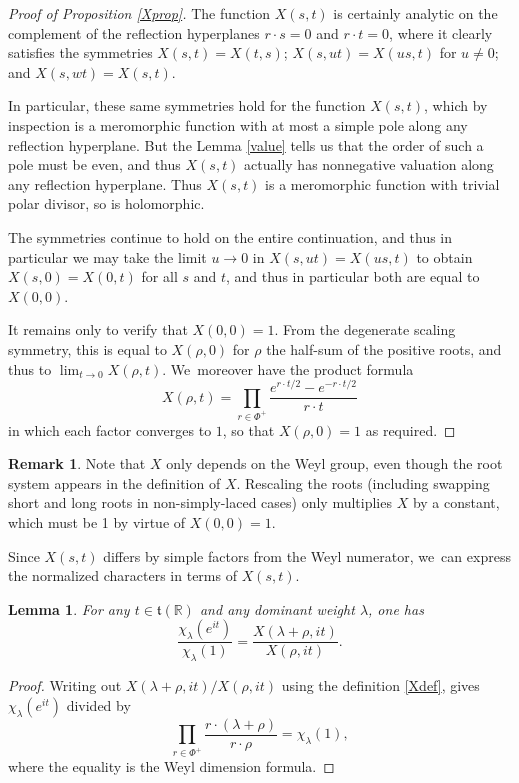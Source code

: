 \documentclass[10pt]{amsart}
\newtheorem{lem}[equation]{Lemma}
\theoremstyle{definition}
\newtheorem{rmk}[equation]{Remark}
\let\la\lambda
\newcommand{\mft}{\mathfrak{t}}
\newcommand{\R}{\mathbb{R}}
\numberwithin{equation}{section}
\begin{document}
\begin{proof}[Proof of Proposition \ref{Xprop}]
The function $X(s,t)$ is certainly analytic on the complement of the
reflection hyperplanes $r\cdot s = 0$ and $r\cdot t = 0$, where it clearly
satisfies the symmetries $X(s,t)=X(t,s)$; $X(s,ut)=X(us,t)$ for $u\ne 0$;
and $X(s,wt)=X(s,t)$.

In particular, these same symmetries hold for the function $X(s,t)$, which
by inspection is a meromorphic function with at most a simple pole along
any reflection hyperplane. But the Lemma \ref{value} tells us that the order of such a pole must be even, and thus $X(s,t)$ actually has nonnegative valuation along any reflection hyperplane. Thus $X(s,t)$ is a meromorphic function with trivial polar divisor, so is holomorphic.

The symmetries continue to hold on the entire continuation, and thus in
particular we may take the limit $u\to 0$ in $X(s,ut)=X(us,t)$ to obtain
$X(s,0)=X(0,t)$ for all $s$ and $t$, and thus in particular both are equal to
$X(0,0)$.

It remains only to verify that $X(0,0)=1$. From the degenerate scaling
symmetry, this is equal to $X(\rho,0)$ for $\rho$ the half-sum of the positive roots, and thus to $\lim_{t\to 0}
X(\rho,t)$. We~moreover have the product formula
\[
X(\rho,t) =
\prod_{r\in \Phi^+} \frac{e^{r\cdot t/2}-e^{-r\cdot t/2}}{r\cdot t}
\]
in which each factor converges to $1$, so that $X(\rho,0)=1$ as required.
\end{proof}

\begin{rmk}
Note that $X$ only depends on the Weyl group, even though the root system appears in the definition of $X$.
Rescaling the roots (including
swapping short and long roots in non-simply-laced cases) only
multiplies $X$ by a constant, which must be 1 by virtue of $X(0,0)=1$.
\end{rmk}

Since $X(s,t)$ differs by simple factors from the Weyl numerator, we~can
express the normalized characters in terms of $X(s,t)$.

\begin{lem} \label{X.dom}
For any $t\in \mft(\R)$ and any dominant weight $\lambda$, one has
\[
\frac{\chi_{\lambda}(e^{it})}{\chi_{\lambda}(1)}
=
\frac{X(\lambda+\rho,it)}{X(\rho,it)}.
\]
\end{lem}

\begin{proof}
Writing out $X(\lambda+\rho, it)/X(\rho, it)$ using the definition \eqref{Xdef}, gives $\chi_\lambda(e^{it})$ divided by
\[
\prod_{r\in \Phi^+} \frac{r\cdot (\lambda+\rho)}{r\cdot \rho} = \chi_\la(1),
\]
where the equality is the Weyl dimension formula.
\end{proof}
\end{document}
